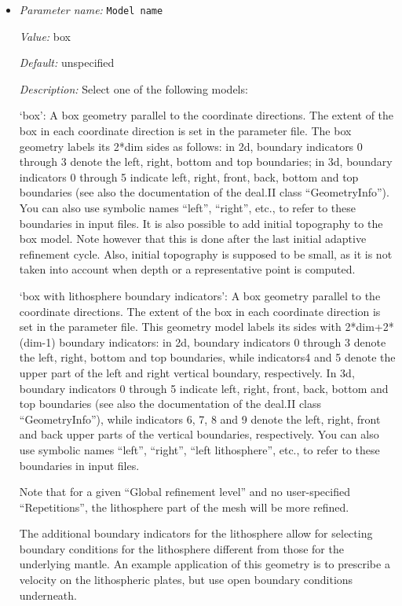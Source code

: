 \begin{itemize}
\item {\it Parameter name:} {\tt Model name}
\label{parameters:Geometry model/Model name}


{\it Value:} box


{\it Default:} unspecified


{\it Description:} Select one of the following models:

`box': A box geometry parallel to the coordinate directions. The extent of the box in each coordinate direction is set in the parameter file. The box geometry labels its 2*dim sides as follows: in 2d, boundary indicators 0 through 3 denote the left, right, bottom and top boundaries; in 3d, boundary indicators 0 through 5 indicate left, right, front, back, bottom and top boundaries (see also the documentation of the deal.II class ``GeometryInfo''). You can also use symbolic names ``left'', ``right'', etc., to refer to these boundaries in input files. It is also possible to add initial topography to the box model. Note however that this is done after the last initial adaptive refinement cycle. Also, initial topography is supposed to be small, as it is not taken into account when depth or a representative point is computed. 

`box with lithosphere boundary indicators': A box geometry parallel to the coordinate directions. The extent of the box in each coordinate direction is set in the parameter file. This geometry model labels its sides with 2*dim+2*(dim-1) boundary indicators: in 2d, boundary indicators 0 through 3 denote the left, right, bottom and top boundaries, while indicators4 and 5 denote the upper part of the left and right vertical boundary, respectively. In 3d, boundary indicators 0 through 5 indicate left, right, front, back, bottom and top boundaries (see also the documentation of the deal.II class ``GeometryInfo''), while indicators 6, 7, 8 and 9 denote the left, right, front and back upper parts of the vertical boundaries, respectively. You can also use symbolic names ``left'', ``right'', ``left lithosphere'', etc., to refer to these boundaries in input files.

Note that for a given ``Global refinement level'' and no user-specified ``Repetitions'', the lithosphere part of the mesh will be more refined. 

The additional boundary indicators for the lithosphere allow for selecting boundary conditions for the lithosphere different from those for the underlying mantle. An example application of this geometry is to prescribe a velocity on the lithospheric plates, but use open boundary conditions underneath. 


\end{itemize}
